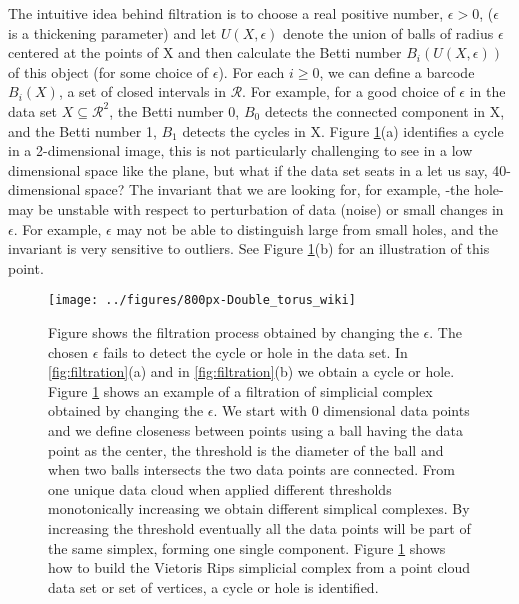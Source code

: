 \documentclass[onecollarge,runningheads]{svjour2}
\begin{document}
The intuitive idea behind filtration is to choose a real positive number, $\epsilon > 0$, ($\epsilon$ is a thickening parameter) and let $U(X,\epsilon)$ denote the union of balls of radius $\epsilon$ centered at the points of X and then calculate the Betti number $B_i(U(X,\epsilon))$ of this object (for some choice of $\epsilon$). 
For each $i \geq 0$, we can define a barcode $B_i(X)$, a set of closed intervals in $\mathcal{R}$. For example, for a good choice of $\epsilon$ in the data set $X \subseteq \mathcal{R}^2$, the Betti number 0, $B_0$ detects the connected component in X, and the Betti number 1, $B_1$ detects the cycles in X.
Figure \ref{fig:whyweneedfiltration}(a) identifies a cycle in a 2-dimensional image, this is not particularly challenging to see in a low dimensional space like the plane, but what if the data set seats in a let us say, 40-dimensional space? 
The invariant that we are looking for, for example, -the hole- may be unstable with respect to perturbation of data (noise) or small changes in $\epsilon$. For example, $\epsilon$ may not be able to distinguish large from small holes, and the invariant is very sensitive to outliers. See Figure \ref{fig:whyweneedfiltration}(b) for an illustration of this point.

\begin{figure}[h]
        \centering
        \texttt{[image: ../figures/800px-Double\_torus\_wiki]}
        \caption{Figure shows the filtration process obtained by changing the $\epsilon$. 
        The chosen $\epsilon$ fails to detect the cycle or hole in the data set. In \ref{fig:filtration}(a) and in \ref{fig:filtration}(b) we obtain a cycle or hole. Figure \ref{fig:whyweneedfiltration} shows an example of a filtration of simplicial complex obtained by changing the $\epsilon$. We start with 0 dimensional data points and we define closeness between points using a ball having the data point as the center, the threshold is the diameter of the ball and when two balls intersects the two data points are connected. From one unique data cloud when applied different thresholds monotonically increasing we obtain different simplical complexes. By increasing the threshold eventually all the data points will be part of the same simplex, forming one single component. Figure \ref{fig:whyweneedfiltration} shows how to build the Vietoris Rips simplicial complex from a point cloud data set or set of vertices, a cycle or hole is identified.}
\label{fig:whyweneedfiltration}
\end{figure}
\end{document}
